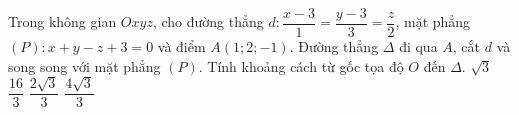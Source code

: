 \begin{ex}%
	Trong không gian $Oxyz$, cho đường thẳng $d\colon\dfrac{x-3}{1}=\dfrac{y-3}{3}=\dfrac{z}{2}$, mặt phẳng $(P)\colon x+y-z+3=0$ và điểm $A(1;2;-1)$. Đường thẳng $\Delta$ đi qua $A$, cắt $d$ và song song với mặt phẳng $\left(P\right)$. Tính khoảng cách từ gốc tọa độ $O$ đến $\Delta$.
	\choice
	{$\sqrt{3}$}
	{$\dfrac{16}{3}$}
	{$\dfrac{2\sqrt{3}}{3}$}
	{\True $\dfrac{4\sqrt{3}}{3}$}
\end{ex}
